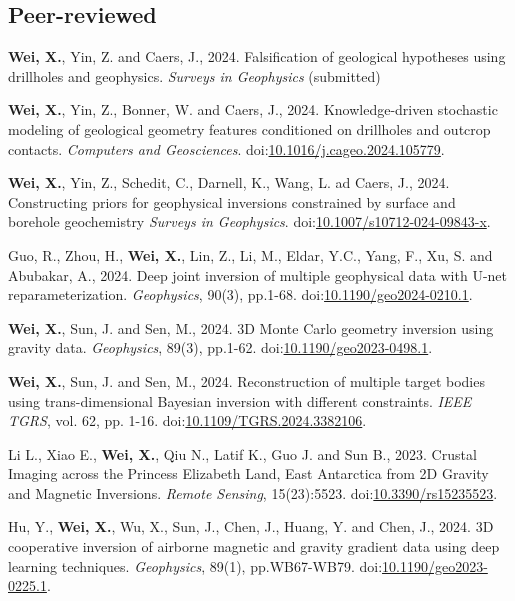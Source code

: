 \documentclass[11pt, a4paper]{article}
\newcommand{\LastName}{Wei}
\newcommand{\Initials}{X}
\newcommand{\Wei}{\textbf{\LastName, \Initials.}}  %
\newcommand{\DOI}[1]{doi:\href{https://doi.org/#1}{#1}}
\begin{document}
\subsection*{Peer-reviewed}
\begin{etaremune}	
	\item
	\Wei, Yin, Z. and Caers, J., 2024. Falsification of geological hypotheses using drillholes and geophysics. \emph{Surveys in Geophysics} (submitted)	
	
	\item
	\Wei, Yin, Z., Bonner, W. and Caers, J., 2024. Knowledge-driven stochastic modeling of geological geometry features conditioned on drillholes and outcrop contacts. \emph{Computers and Geosciences}. \DOI{10.1016/j.cageo.2024.105779}.
	
	\item 
	\Wei, Yin, Z., Schedit, C., Darnell, K., Wang, L. ad Caers, J., 2024. Constructing priors for geophysical inversions constrained by surface and borehole geochemistry \emph{Surveys in Geophysics}. \DOI{10.1007/s10712-024-09843-x}.
	
	\item
	Guo, R., Zhou, H., \Wei, Lin, Z., Li, M., Eldar, Y.C., Yang, F., Xu, S. and Abubakar, A., 2024. Deep joint inversion of multiple geophysical data with U-net reparameterization. \emph{Geophysics}, 90(3), pp.1-68. \DOI{10.1190/geo2024-0210.1}. 
	
	\item
	\Wei, Sun, J. and Sen, M., 2024. 3D Monte Carlo geometry inversion using gravity data. \emph{Geophysics}, 89(3), pp.1-62. \DOI{10.1190/geo2023-0498.1}.
	
	\item
	\Wei, Sun, J. and Sen, M., 2024. Reconstruction of multiple target bodies using trans-dimensional Bayesian inversion with different constraints. \emph{IEEE TGRS}, vol. 62, pp. 1-16. \DOI{10.1109/TGRS.2024.3382106}. 
	
	\item
	Li L., Xiao E., \Wei, Qiu N., Latif K., Guo J. and Sun B., 2023. Crustal Imaging across the Princess Elizabeth Land, East Antarctica from 2D Gravity and Magnetic Inversions. \emph{Remote Sensing}, 15(23):5523. \DOI{10.3390/rs15235523}.
	
	\item
	Hu, Y., \Wei, Wu, X., Sun, J., Chen, J., Huang, Y. and Chen, J., 2024. 3D cooperative inversion of airborne magnetic and gravity gradient data using deep learning techniques. \emph{Geophysics}, 89(1), pp.WB67-WB79. \DOI{10.1190/geo2023-0225.1}.
	

\end{etaremune}
\end{document}

